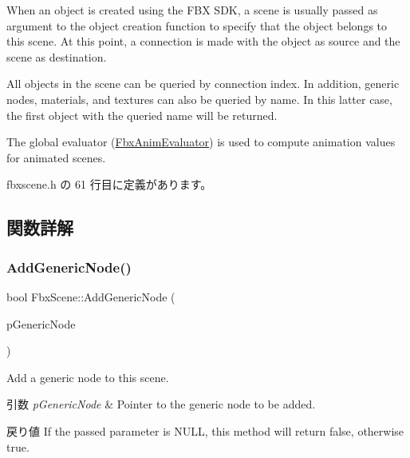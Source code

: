 When an object is created using the F\+BX S\+DK, a scene is usually passed as argument to the object creation function to specify that the object belongs to this scene. At this point, a connection is made with the object as source and the scene as destination.

All objects in the scene can be queried by connection index. In addition, generic nodes, materials, and textures can also be queried by name. In this latter case, the first object with the queried name will be returned.

The global evaluator (\hyperlink{class_fbx_anim_evaluator}{Fbx\+Anim\+Evaluator}) is used to compute animation values for animated scenes. 

 fbxscene.\+h の 61 行目に定義があります。



\subsection{関数詳解}
\mbox{\label{class_fbx_scene_aedfcc888eda10e083a10646875390d6d}} 
\subsubsection{\texorpdfstring{Add\+Generic\+Node()}{AddGenericNode()}}
{\footnotesize\ttfamily bool Fbx\+Scene\+::\+Add\+Generic\+Node (\begin{DoxyParamCaption}\item[{\hyperlink{class_fbx_generic_node}{Fbx\+Generic\+Node} $\ast$}]{p\+Generic\+Node }\end{DoxyParamCaption})}

Add a generic node to this scene. 
\begin{DoxyParams}{引数}
{\em p\+Generic\+Node} & Pointer to the generic node to be added. \\
\hline
\end{DoxyParams}
\begin{DoxyReturn}{戻り値}
If the passed parameter is {\ttfamily N\+U\+LL}, this method will return {\ttfamily false}, otherwise {\ttfamily true}. 
\end{DoxyReturn}
\mbox{\label{class_fbx_scene_a43871135355dec7e9eb2070b93e61423}} 

